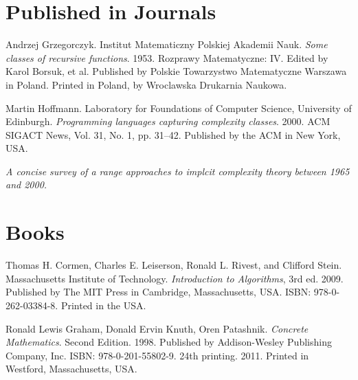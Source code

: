 \begin{thebibliography}{9} %

\section*{Published in Journals}


Andrzej Grzegorczyk. Institut Matematiczny Polskiej Akademii Nauk. \emph{Some
classes of recursive functions}. 1953. Rozprawy Matematyczne: IV. Edited by
Karol Borsuk, et al. Published by Polskie Towarzystwo Matematyczne Warszawa in
Poland. Printed in Poland, by Wroclawska Drukarnia Naukowa.

\backrefprint


Martin Hoffmann. Laboratory for Foundations of Computer Science, University of
Edinburgh. \emph{Programming languages capturing complexity classes}. 2000. ACM
SIGACT News, Vol. 31, No. 1, pp. 31--42. Published by the ACM in New York, USA.

\emph{A concise survey of a range approaches to implcit complexity theory
between 1965 and 2000.}

\backrefprint

\section*{Books}


Thomas H. Cormen, Charles E. Leiserson, Ronald L. Rivest, and Clifford Stein.
Massachusetts Institute of Technology.  \emph{Introduction to Algorithms}, 3rd
ed. 2009. Published by The MIT Press in Cambridge, Massachusetts, USA. ISBN:
978-0-262-03384-8. Printed in the USA.

\backrefprint


Ronald Lewis Graham, Donald Ervin Knuth, Oren Patashnik. \emph{Concrete
Mathematics}. Second Edition. 1998. Published by Addison-Wesley Publishing
Company, Inc. ISBN: 978-0-201-55802-9. 24th printing. 2011. Printed in
Westford, Massachusetts, USA.

\backrefprint



\end{thebibliography}
